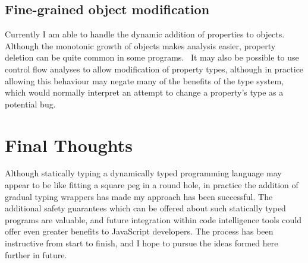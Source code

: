 \documentclass[12pt,a4paper,twoside,openright]{report}
\theoremstyle{definition}
\theoremstyle{dotless}
\begin{document}
\subsection{Fine-grained object modification}

Currently I am able to handle the dynamic addition of properties to objects. 
Although the monotonic growth of objects makes analysis easier, property deletion
can be quite common in some programs.~\cite{JSBehaviour} It may also be possible
to use control flow analyses to allow modification of property types, although
in practice allowing this behaviour may negate many of the benefits of the type system, which 
would normally interpret an attempt to change a property's type as a potential bug.

\section{Final Thoughts}

Although statically typing a dynamically typed programming language may appear
to be like fitting a square peg in a round hole, in practice the addition of
gradual typing wrappers has made my approach has been successful. The
additional safety guarantees which can be offered about such statically typed
programs are valuable, and future integration within code intelligence tools
could offer even greater benefits to JavaScript developers.  The process has
been instructive from start to finish, and I hope to pursue the ideas formed
here further in future.
\end{document}
